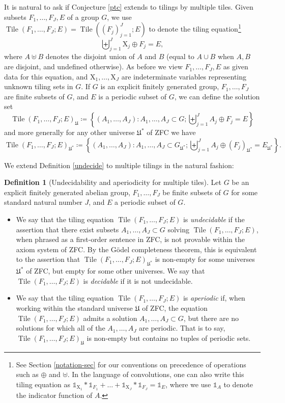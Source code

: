 \documentclass[reqno,a4paper,12pt]{amsart}
\numberwithin{equation}{section}
\numberwithin{figure}{section}
\def\one{\mathds{1}}
\newcommand\X{\mathrm{X}}
\newcommand{\Tile}{\operatorname{Tile}}
\newcommand{\Universe}{{\mathfrak{U}}}
\theoremstyle{plain}
\theoremstyle{definition}
\newtheorem{definition}[thm]{Definition}
\begin{document}
It is natural to ask if Conjecture \ref{ptc} extends to tilings by multiple tiles.  Given subsets $F_1,\dots,F_J,E$ of a group $G$, we use $\Tile(F_1,\dots,F_J;E) = \Tile((F_j)_{j=1}^J; E)$ to denote the tiling equation\footnote{See Section \ref{notation-sec} for our conventions on precedence of operations such as $\oplus$ and $\uplus$.  In the language of convolutions, one can also write this tiling equation as $\one_{\X_1} * \one_{F_1} + \dots + \one_{\X_J} * \one_{F_J} = \one_E$, where we use $\one_A$ to denote the indicator function of $A$.}
\begin{equation}\label{multitile}
\biguplus_{j=1}^J \X_j \oplus F_j = E,
\end{equation}
where $A \uplus B$ denotes the disjoint union of $A$ and $B$ (equal to $A \cup B$ when $A,B$ are disjoint, and undefined otherwise).  As before we view $F_1,\dots,F_J,E$ as given data for this equation, and $\X_1,\dots,\X_J$ are indeterminate variables representing unknown tiling sets in $G$.  If $G$ is an explicit finitely generated group, $F_1,\dots,F_J$ are finite subsets of $G$, and $E$ is a periodic subset of $G$, we can define the solution set
$$
\Tile(F_1,\dots,F_J;E)_\Universe \coloneqq \left\{ (A_1,\dots,A_J) \colon A_1,\dots,A_J \subset G; \biguplus_{j=1}^J A_j \oplus F_j = E \right\}$$
and more generally for any other universe $\Universe^*$ of ZFC we have
$$
\Tile(F_1,\dots,F_J;E)_{\Universe^*} \coloneqq \left\{ (A_1,\dots,A_J) \colon A_1,\dots,A_J \subset G_{\Universe^*}; \biguplus_{j=1}^J A_j \oplus (F_j)_{\Universe^*} = E_{\Universe^*} \right\}.$$

We extend Definition \ref{undecide} to multiple tilings in the natural fashion:

\begin{definition}[Undecidability and aperiodicity for multiple tiles]\label{undecide-mult}  Let $G$ be an explicit finitely generated abelian group, $F_1,\dots,F_J$ be finite subsets of $G$ for some standard natural number $J$, and $E$ a periodic subset of $G$.
\begin{itemize}
\item[(i)]  We say that the tiling equation $\Tile(F_1,\dots,F_J;E)$ is \emph{undecidable} if the assertion that there exist subsets $A_1,\dots,A_J \subset G$ solving $\Tile(F_1,\dots,F_J;E)$, when phrased as a first-order sentence in ZFC, is not provable within the axiom system of ZFC. By the G\"odel completeness theorem, this is equivalent to the assertion that $\Tile(F_1,\dots,F_J;E)_{\Universe^*}$ is non-empty for some universes $\Universe^*$ of ZFC, but empty for some other universes. We say that $\Tile(F_1,\dots,F_J;E)$ is \emph{decidable} if it is not undecidable.
\item[(ii)]  We say that the tiling equation $\Tile(F_1,\dots,F_J;E)$ is \emph{aperiodic} if, when working within the standard universe $\Universe$ of ZFC, the equation $\Tile(F_1,\dots,F_J;E)$ admits a solution $A_1,\dots,A_J \subset G$, but there are no solutions for which all of the $A_1,\dots,A_J$ are periodic. That is to say, $\Tile(F_1,\dots,F_J;E)_\Universe$ is non-empty but contains no tuples of periodic sets.
\end{itemize}
\end{definition}
\end{document}
